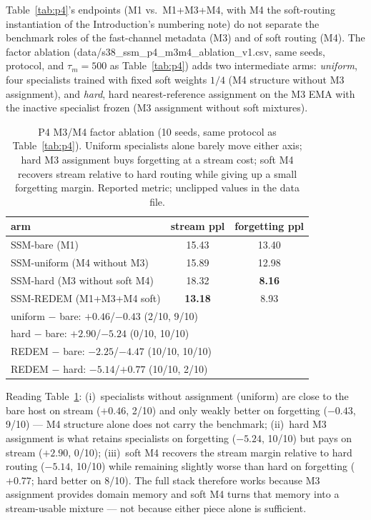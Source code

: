 \documentclass[preprint,12pt]{elsarticle}
\begin{document}
Table~\ref{tab:p4}'s endpoints (M1 vs.\ M1+M3+M4, with M4 the soft-routing
instantiation of the Introduction's numbering note) do not separate the
benchmark roles of the fast-channel metadata (M3) and of soft routing
(M4). The factor ablation (data/s38\_ssm\_p4\_m3m4\_ablation\_v1.csv,
same seeds, protocol, and $\tau_m{=}500$ as Table~\ref{tab:p4}) adds two
intermediate arms: \emph{uniform}, four specialists trained with fixed
soft weights $1/4$ (M4 structure without M3 assignment), and
\emph{hard}, hard nearest-reference assignment on the M3 EMA with the
inactive specialist frozen (M3 assignment without soft mixtures).

\begin{table}[t]
\centering
\small
\begin{tabular}{lcc}
\toprule
arm & stream ppl & forgetting ppl \\
\midrule
SSM-bare (M1) & 15.43 & 13.40 \\
SSM-uniform (M4 without M3) & 15.89 & 12.98 \\
SSM-hard (M3 without soft M4) & 18.32 & \textbf{8.16} \\
SSM-REDEM (M1+M3+M4 soft) & \textbf{13.18} & 8.93 \\
\midrule
\multicolumn{3}{l}{\scriptsize uniform $-$ bare: $+0.46$/$-0.43$ (2/10, 9/10)} \\
\multicolumn{3}{l}{\scriptsize hard $-$ bare: $+2.90$/$-5.24$ (0/10, 10/10)} \\
\multicolumn{3}{l}{\scriptsize REDEM $-$ bare: $-2.25$/$-4.47$ (10/10, 10/10)} \\
\multicolumn{3}{l}{\scriptsize REDEM $-$ hard: $-5.14$/$+0.77$ (10/10, 2/10)} \\
\bottomrule
\end{tabular}
\caption{P4 M3/M4 factor ablation (10 seeds, same protocol as
Table~\ref{tab:p4}). Uniform specialists alone barely move either axis;
hard M3 assignment buys forgetting at a stream cost; soft M4 recovers
stream relative to hard routing while giving up a small forgetting
margin. Reported metric; unclipped values in the data file.}
\label{tab:m3m4}
\end{table}

Reading Table~\ref{tab:m3m4}: (i)~specialists without assignment
(uniform) are close to the bare host on stream ($+0.46$, 2/10) and only
weakly better on forgetting ($-0.43$, 9/10) --- M4 structure alone does
not carry the benchmark; (ii)~hard M3 assignment is what retains
specialists on forgetting ($-5.24$, 10/10) but pays on stream ($+2.90$,
0/10); (iii)~soft M4 recovers the stream margin relative to hard
routing ($-5.14$, 10/10) while remaining slightly worse than hard on
forgetting ($+0.77$; hard better on 8/10). The full stack therefore
works because M3 assignment provides domain memory and soft M4 turns
that memory into a stream-usable mixture --- not because either piece
alone is sufficient.
\end{document}
